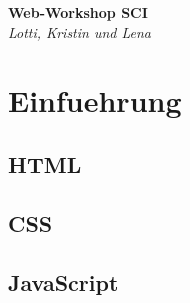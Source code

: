 \documentclass[12pt]{article}
\begin{document}
\begin{center}
\Large\textbf{Web-Workshop SCI}\\
\large\textit{Lotti, Kristin und Lena}
\end{center}

\section{Einfuehrung}

\subsection{HTML}



\subsection{CSS}



\subsection{JavaScript}


\end{document}

